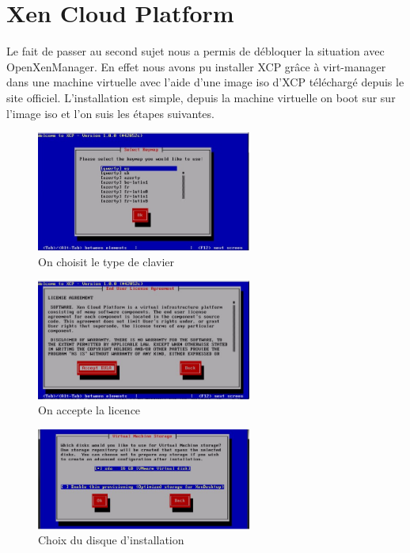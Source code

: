 \section{Xen Cloud Platform}
Le fait de passer au second sujet nous a permis de débloquer la situation avec OpenXenManager.
En effet nous avons pu installer XCP grâce à virt-manager dans une machine virtuelle avec l'aide d'une image iso d'XCP téléchargé depuis le site officiel.
L'installation est simple, depuis la machine virtuelle on boot sur sur l'image iso et l'on suis les étapes suivantes.
\begin{figure}
\begin{center}
\includegraphics[width=200pt]{images/1.png}
\end{center}
\caption{On choisit le  type de clavier}
\end{figure}
\begin{figure}
\begin{center}
\includegraphics[width=200pt]{images/2.png}
\end{center}
\caption{On accepte la licence}
\end{figure}
\begin{figure}
\begin{center}
\includegraphics[width=200pt]{images/3.png}
\end{center}
\caption{Choix du disque d'installation}
\end{figure}
